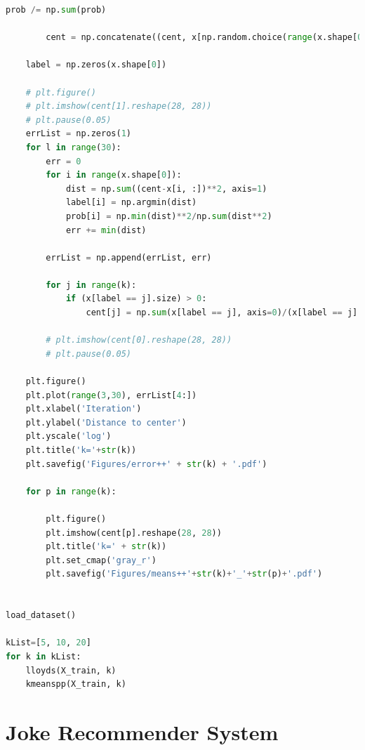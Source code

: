 \documentclass{article}
\newcommand{\1}{\mathbf{1}}
\begin{document}
\begin{lstlisting}[language=Python]
        prob /= np.sum(prob)

        cent = np.concatenate((cent, x[np.random.choice(range(x.shape[0]), 1, p=prob)]))

    label = np.zeros(x.shape[0])

    # plt.figure()
    # plt.imshow(cent[1].reshape(28, 28))
    # plt.pause(0.05)
    errList = np.zeros(1)
    for l in range(30):
        err = 0
        for i in range(x.shape[0]):
            dist = np.sum((cent-x[i, :])**2, axis=1)
            label[i] = np.argmin(dist)
            prob[i] = np.min(dist)**2/np.sum(dist**2)
            err += min(dist)

        errList = np.append(errList, err)

        for j in range(k):
            if (x[label == j].size) > 0:
                cent[j] = np.sum(x[label == j], axis=0)/(x[label == j].size)

        # plt.imshow(cent[0].reshape(28, 28))
        # plt.pause(0.05)

    plt.figure()
    plt.plot(range(3,30), errList[4:])
    plt.xlabel('Iteration')
    plt.ylabel('Distance to center')
    plt.yscale('log')
    plt.title('k='+str(k))
    plt.savefig('Figures/error++' + str(k) + '.pdf')

    for p in range(k):

        plt.figure()
        plt.imshow(cent[p].reshape(28, 28))
        plt.title('k=' + str(k))
        plt.set_cmap('gray_r')
        plt.savefig('Figures/means++'+str(k)+'_'+str(p)+'.pdf')


load_dataset()

kList=[5, 10, 20]
for k in kList:
    lloyds(X_train, k)
    kmeanspp(X_train, k)
\end{lstlisting}


\section{Joke Recommender System}
\end{document}
